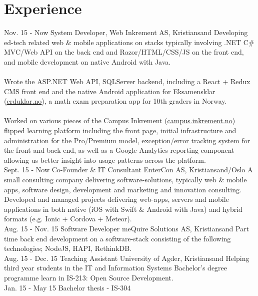 \documentclass[]{cv-class}
\begin{document}
\section{Experience}
\begin{entrylist}
  \entry
    {Nov. 15 - Now}
    {System Developer, Web}
    {Inkrement AS, Kristiansand}
    {Developing ed-tech related web \& mobile applications on stacks typically involving .NET C\# MVC/Web API on the back end
    and Razor/HTML/CSS/JS on the front end, and mobile development on native Android with Java.\\\\
    Wrote the ASP.NET Web API, SQLServer backend, including a React + Redux CMS front end and the native Android
    application for Eksamensklar (\underline{\href{http://erduklar.no/}{erduklar.no}}),
    a math exam preparation app for 10th graders in Norway.\\\\
    Worked on various pieces of the Campus Inkrement 
    (\underline{\href{https://campus.inkrement.no}{campus.inkrement.no}})
    flipped learning platform including the front
    page, initial infrastructure and administration for the Pro/Premium model, exception/error tracking system for the front and
    back end, as well as a Google Analytics reporting component allowing us better insight into usage patterns across the
    platform.\\}
  \entry
    {Sept. 15 - Now}
    {Co-Founder \& IT Consultant}
    {EnterCon AS, Kristiansand/Oslo}
    {A small consulting company delivering software-solutions, typically web \& mobile apps, software design, 
    development and marketing and innovation consulting.\\
	Developed and managed projects delivering web-apps, servers and mobile applications in both native 
	(iOS with Swift \& Android with Java) and hybrid formats (e.g. Ionic + Cordova + Meteor). \\}
  \entry
    {Aug. 15 - Nov. 15}
    {Software Developer}
    {meQuire Solutions AS, Kristiansand}
    {Part time back end development on a software-stack consisting of the following
    technologies; NodeJS, HAPI, RethinkDB.\\}
  \entry
    {Aug. 15 - Dec. 15}
    {Teaching Assistant}
    {University of Agder, Kristiansand}
    {Helping third year students in the IT and Information Systems Bachelor's degree programme
    learn in IS-213: Open Source Development.\\}
  \entry
    {Jan. 15 - May 15}
    {Bachelor thesis - IS-304}

\end{entrylist}
\end{document}
